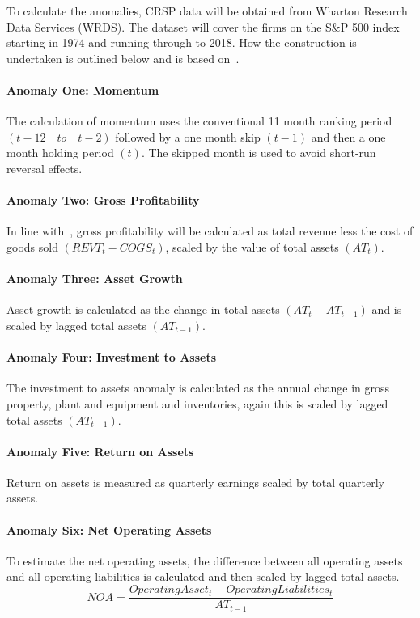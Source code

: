 \documentclass[a4paper]{article}                 %
\begin{document}
To calculate the anomalies, CRSP data will be obtained from Wharton Research Data Services (WRDS). The dataset will cover the firms on the S\&P 500 index starting in 1974 and running through to 2018. How the construction is undertaken is outlined below and is based on~\cite{chu2017causal}.

\paragraph*{Anomaly One: Momentum}
The calculation of momentum uses the conventional 11 month ranking period \((t-12 \quad to \quad t-2)\) followed by a one month skip $(t-1)$ and then a one month holding period $(t)$. The skipped month is used to avoid short-run reversal effects.

\paragraph*{Anomaly Two: Gross Profitability}
In line with~\cite{novy2013other}, gross profitability will be calculated as total revenue less the cost of goods sold \((REVT_t-COGS_t)\), scaled by the value of total assets $(AT_t)$. 

\paragraph*{Anomaly Three: Asset Growth}
Asset growth is calculated as the change in total assets \((AT_t  - AT_{t-1})\) and is scaled by lagged total assets \((AT_{t-1})\).

\paragraph*{Anomaly Four: Investment to Assets}
The investment to assets anomaly is calculated as the annual change in gross property, plant and equipment and inventories, again this is scaled by lagged total assets \((AT_{t-1})\). 

\paragraph*{Anomaly Five: Return on Assets}
Return on assets is measured as quarterly earnings scaled by total quarterly assets. 

\paragraph*{Anomaly Six: Net Operating Assets}
To estimate the net operating assets, the difference between all operating assets and all operating liabilities is calculated and then scaled by lagged total assets.
\[
NOA= \frac{Operating Asset_t-Operating Liabilities_t}{AT_{t-1}}\]
\end{document}
